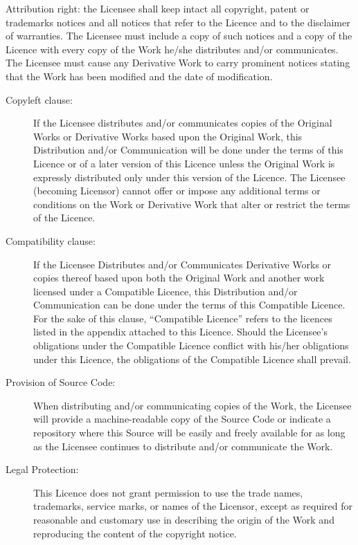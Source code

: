 \documentclass[letterpaper,10pt,english]{sphinxmanual}
\begin{document}
Attribution right: the Licensee shall keep intact all copyright, patent or trademarks
notices and all notices that refer to the Licence and to the disclaimer of warranties.
The Licensee must include a copy of such notices and a copy of the Licence with
every copy of the Work he/she distributes and/or communicates. The Licensee must
cause any Derivative Work to carry prominent notices stating that the Work has been
modified and the date of modification.
\begin{description}
\item[{Copyleft clause:}] \leavevmode
If the Licensee distributes and/or communicates copies of the
Original Works or Derivative Works based upon the Original Work, this Distribution
and/or Communication will be done under the terms of this Licence or of a later
version of this Licence unless the Original Work is expressly distributed only under
this version of the Licence. The Licensee (becoming Licensor) cannot offer or impose
any additional terms or conditions on the Work or Derivative Work that alter or
restrict the terms of the Licence.

\item[{Compatibility clause:}] \leavevmode
If the Licensee Distributes and/or Communicates Derivative
Works or copies thereof based upon both the Original Work and another work
licensed under a Compatible Licence, this Distribution and/or Communication can be
done under the terms of this Compatible Licence. For the sake of this clause,
“Compatible Licence” refers to the licences listed in the appendix attached to this
Licence. Should the Licensee’s obligations under the Compatible Licence conflict
with his/her obligations under this Licence, the obligations of the Compatible Licence
shall prevail.

\item[{Provision of Source Code:}] \leavevmode
When distributing and/or communicating copies of the
Work, the Licensee will provide a machine-readable copy of the Source Code or
indicate a repository where this Source will be easily and freely available for as long
as the Licensee continues to distribute and/or communicate the Work.

\item[{Legal Protection:}] \leavevmode
This Licence does not grant permission to use the trade names,
trademarks, service marks, or names of the Licensor, except as required for
reasonable and customary use in describing the origin of the Work and reproducing
the content of the copyright notice.

\end{description}
\end{document}
